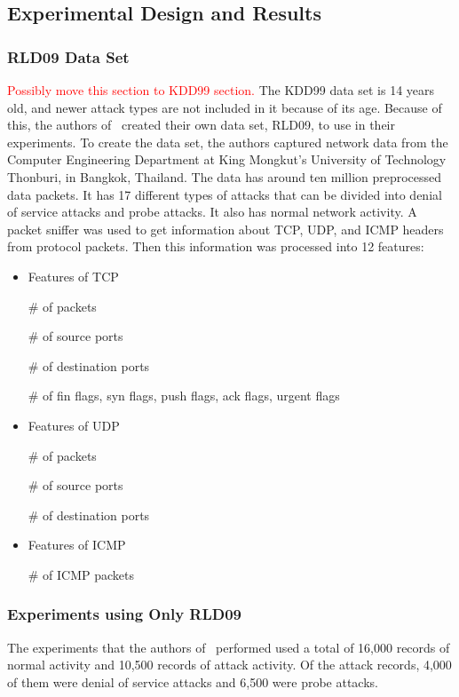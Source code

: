 \documentclass{sig-alternate}
\newcommand{\mycomment}[1]{\textcolor{red}{#1}}
\begin{document}
\subsection{Experimental Design and Results}

\subsubsection{RLD09 Data Set}
\mycomment{Possibly move this section to KDD99 section.}
The KDD99 data set is 14 years old, and newer attack types are not included in it because of its age. Because of this, the authors of~\cite{6496342, 6559603} created their own data set, RLD09, to use in their experiments. To create the data set, the authors captured network data from the Computer Engineering Department at King Mongkut's University of Technology Thonburi, in Bangkok, Thailand. The data has around ten million preprocessed data packets. It has 17 different types of attacks that can be divided into denial of service attacks and probe attacks. It also has normal network activity. A packet sniffer was used to get information about TCP, UDP, and ICMP headers from protocol packets. Then this information was processed into 12 features:
\begin{itemize}
  \item Features of TCP

    \# of packets

    \# of source ports

    \# of destination ports

    \# of fin flags, syn flags, push flags, ack flags, urgent flags
  \item Features of UDP

    \# of packets

    \# of source ports

    \# of destination ports
  \item Features of ICMP

    \# of ICMP packets
\end{itemize}




\subsubsection{Experiments using Only RLD09}
The experiments that the authors of~\cite{6496342, 6559603} performed used a total of 16,000 records of normal activity and 10,500 records of attack activity. Of the attack records, 4,000 of them were denial of service attacks and 6,500 were probe attacks.
\end{document}
